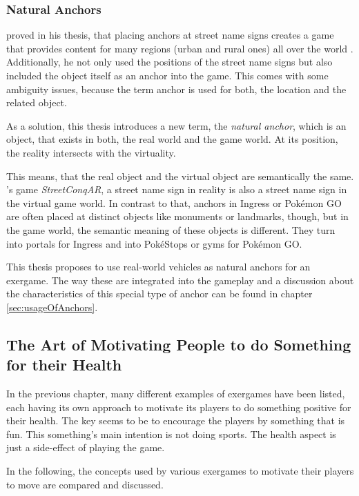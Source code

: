 \subsubsection{Natural Anchors}
\citeauthor{hock2014augmented} proved in his thesis, that placing anchors at street name signs creates a game that provides content for many regions (urban and rural ones) all over the world \cite{hock2014augmented}. Additionally, he not only used the positions of the street name signs but also included the object itself as an anchor into the game. This comes with some ambiguity issues, because the term anchor is used for both, the location and the related object.

As a solution, this thesis introduces a new term, the \emph{natural anchor}, which is an object, that exists in both, the real world and the game world. At its position, the reality intersects with the virtuality.

This means, that the real object and the virtual object are semantically the same. \citep{hock2014augmented}'s game \emph{StreetConqAR}, a street name sign in reality is also a street name sign in the virtual game world. In contrast to that, anchors in Ingress or Pok\'{e}mon GO are often placed at distinct objects like monuments or landmarks, though, but in the game world, the semantic meaning of these objects is different. They turn into portals for Ingress and into Pok\'{e}Stops or gyms for Pok\'{e}mon GO.

This thesis proposes to use real-world vehicles as natural anchors for an exergame. The way these are integrated into the gameplay and a discussion about the characteristics of this special type of anchor can be found in chapter \ref{sec:usageOfAnchors}.

\subsection{The Art of Motivating People to do Something for their Health}\label{sec:motivationToMove}
In the previous chapter, many different examples of exergames have been listed, each having its own approach to motivate its players to do something positive for their health. The key seems to be to encourage the players by something that is fun. This something's main intention is not doing sports. The health aspect is just a side-effect of playing the game.

In the following, the concepts used by various exergames to motivate their players to move are compared and discussed.

